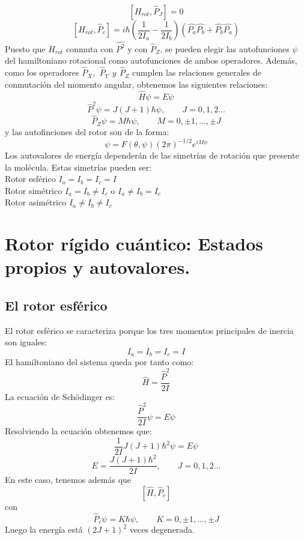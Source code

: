 \documentclass[a4paper]{article}
\begin{document}
\begin{equation}
\left[H_{rot}, \hat P_J \right] = 0
\end{equation}
\begin{equation}
\left[H_{rot}, \hat P_c \right] = i\hbar \left(\frac{1}{2I_a}-\frac{1}{2I_b}\right)\left(\hat{P_a}\hat{P_b}+\hat{P_b}\hat{P_a}\right)
\end{equation}
Puesto que $H_{rot}$ conmuta con $\hat{P^2}$ y con $\hat P_Z$,  se pueden elegir las autofunciones $\psi$ del hamiltoniano rotacional como autofunciones de ambos operadores. Además, como los operadores $\hat P_X, \,\ \hat P_Y \,\ y \,\ \hat P_Z$ cumplen las relaciones generales de conmutación del momento angular, obtenemos las siguientes relaciones:
\begin{equation}
\hat H\psi = E\psi
\end{equation}
\begin{equation}
\hat P^2\psi = J(J+1)\hbar \psi, \qquad J=0,1,2...
\end{equation}
\begin{equation}
\hat P_Z\psi = M\hbar\psi, \qquad M = 0,\pm 1,...,\pm J
\end{equation}
y las autofinciones del rotor son de la forma:
\begin{equation}
\psi = F(\theta, \psi)(2\pi)^{-1/2}e^{iM\phi}
\end{equation}
Los autovalores de energía dependerán de las simetrías de rotación que presente la molécula. Estas simetrías pueden ser:\\
Rotor esférico $I_a=I_b=I_c= I$ \\
Rotor simétrico $I_a=I_b \neq I_c$ o $I_a\neq I_b=I_c$\\
Rotor asimétrico $I_a \neq I_b \neq I_c$\\
\section{Rotor rígido cuántico: Estados propios y autovalores.}
\subsection{El rotor esférico}
El rotor esférico se caracteriza porque los tres momentos principales de inercia son iguales: $$I_a=I_b=I_c= I$$
El hamiltoniano del sistema queda por tanto como:
\begin{equation}
\hat H = \frac{\hat P^2}{2I}
\end{equation}
La ecuación de Schödinger es:
\begin{equation}
\frac{\hat P^2}{2I} \psi = E\psi
\end{equation}
Resolviendo la ecuación obtenemos que:$$\frac{1}{2I}J(J+1)\hbar^2\psi=E\psi$$
\begin{equation}
E=\frac{J(J+1)\hbar^2}{2I}, \qquad J=0,1,2...
\end{equation}
En este caso, tenemos además que
\begin{equation}
\left[\hat H,\hat P_c \right]
\end{equation}
con $$\hat P_c \psi = K\hbar\psi, \qquad K = 0, \pm 1,..., \pm J$$
Luego la energía está $(2J+1)^2$ veces degenerada.
\end{document}
